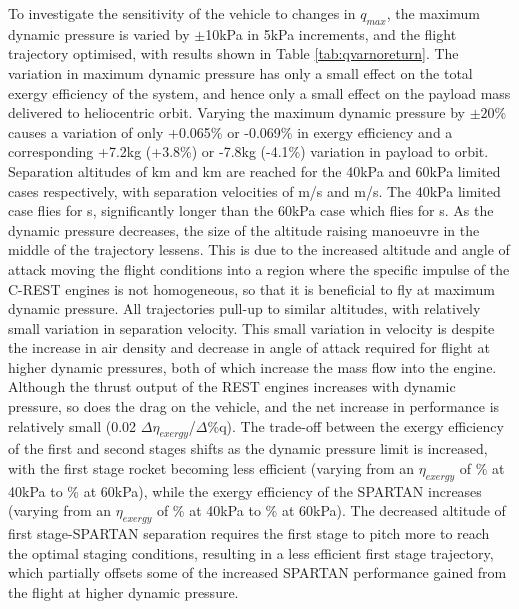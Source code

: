 To investigate the sensitivity of the vehicle to changes in $q_{max}$, the maximum dynamic pressure is varied by $\pm$10kPa in 5kPa increments, and the flight trajectory optimised, with results shown in Table \ref{tab:qvarnoreturn}.
The variation in maximum dynamic pressure has only a small effect on the total exergy efficiency of the system, and hence only a small effect on the payload mass delivered to heliocentric orbit.  Varying the maximum dynamic pressure by $\pm20\%$ causes a variation of only +0.065\% or -0.069\% in exergy efficiency and a corresponding +7.2kg (+3.8\%) or -7.8kg (-4.1\%) variation in payload to orbit.  
Separation altitudes of \secondthirdSeparationAltqFortyNoReturn km and \secondthirdSeparationAltqSixtyNoReturn km are reached for the 40kPa and 60kPa limited cases respectively, with separation velocities of \secondthirdSeparationvqFortyNoReturn m/s and \secondthirdSeparationvqSixtyNoReturn m/s. The 40kPa limited case flies for \secondFlightTimeqFortyNoReturn s, significantly longer than the 60kPa case which flies for \secondFlightTimeqSixtyNoReturn s.
As the dynamic pressure decreases, the size of the altitude raising manoeuvre in the middle of the trajectory lessens. This is due to the increased altitude and angle of attack moving the flight conditions into a region where the specific impulse of the C-REST engines is not homogeneous, so that it is beneficial to fly at maximum dynamic pressure.  
All trajectories pull-up to similar altitudes, with relatively small variation in separation velocity.
This small variation in velocity is despite the increase in air density and decrease in angle of attack required for flight at higher dynamic pressures, both of which increase the mass flow into the engine. Although the thrust output of the REST engines increases with dynamic pressure, so does the drag on the vehicle, and the net increase in performance is relatively small (0.02 $\Delta\eta_{exergy}$/$\Delta$\%q). 
The trade-off between the exergy efficiency of the first and second stages shifts as the dynamic pressure limit is increased, with the first stage rocket becoming less efficient (varying from an $\eta_{exergy}$ of \firstExergyEffqFortyNoReturn \% at 40kPa to \firstExergyEffqSixtyNoReturn \% at 60kPa), while the exergy efficiency of the SPARTAN increases (varying from an $\eta_{exergy}$ of \secondExergyEffqFortyNoReturn \% at 40kPa to \secondExergyEffqSixtyNoReturn \% at 60kPa). The decreased altitude of first stage-SPARTAN separation requires the first stage to pitch more to reach the optimal staging conditions, resulting in a less efficient first stage trajectory, which partially offsets some of the increased SPARTAN performance gained from the flight at higher dynamic pressure. 


